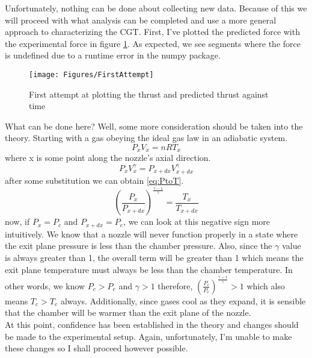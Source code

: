 Unfortunately, nothing can be done about collecting new data. Because of this we will proceed with what analysis can be completed and use a more general approach to characterizing the CGT. First, I've plotted the predicted force with the experimental force in figure \ref{fig:FirstThrust}. As expected, we see segments where the force is undefined due to a runtime error in the numpy package.
\begin{figure}[h!]
\centering
\texttt{[image: Figures/FirstAttempt]}
\caption{First attempt at plotting the thrust and predicted thrust against time}
\label{fig:FirstThrust}
\end{figure}
What can be done here? Well, some more consideration should be taken into the theory. Starting with a gas obeying the ideal gas law in an adiabatic system.
\begin{equation}\label{eq:IGL}
P_xV_x=nRT_x
\end{equation}
where x is some point along the nozzle's axial direction.
\begin{equation}\label{eq:Adiabat}
P_xV_x^{\gamma}=P_{x+dx}V_{x+dx}^{\gamma}
\end{equation}
after some substitution we can obtain \ref{eq:PtoT}.
\begin{equation}\label{eq:PtoT}
\left(\frac{P_x}{P_{x+dx}}\right)^{\frac{\gamma-1}{\gamma}}=\frac{T_x}{T_{x+dx}}
\end{equation}
now, if $P_x=P_c$ and $P_{x+dx}=P_e$, we can look at this negative sign more intuitively. We know that a nozzle will never function properly in a state where the exit plane pressure is less than the chamber pressure. Also, since the $\gamma$ value is always greater than 1, the overall term will be greater than 1 which means the exit plane temperature must always be less than the chamber temperature. In other words, we know $P_c>P_e$ and $\gamma>1$ therefore, $\left(\frac{P_c}{P_e}\right)^{\frac{\gamma-1}{\gamma}}>1$ which also means $T_c>T_e$ always. Additionally, since gases cool as they expand, it is sensible that the chamber will be warmer than the exit plane of the nozzle.\\
At this point, confidence has been established in the theory and changes should be made to the experimental setup. Again, unfortunately, I'm unable to make these changes so I shall proceed however possible.\\
